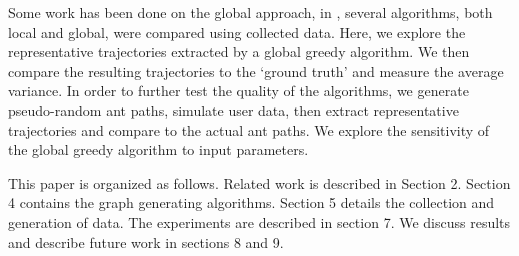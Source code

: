 \documentclass[12pt]{article}
\begin{document}
\indent Some work has been done on the global approach, in \cite{Cruz13}, several algorithms, both local and global, were compared using collected data. Here, we explore the representative trajectories extracted by a global greedy algorithm. We then compare the resulting trajectories to the `ground truth' and measure the average variance. In order to further test the quality of the algorithms, we generate pseudo-random ant paths, simulate user data, then extract representative trajectories and compare to the actual ant paths. We explore the sensitivity of the global greedy algorithm to input parameters.

\indent This paper is organized as follows. Related work is described in Section 2. Section 4 contains the graph generating algorithms. Section 5 details the collection and generation of data. The experiments are described in section 7. We discuss results and describe future work in sections 8 and 9.
\end{document}
